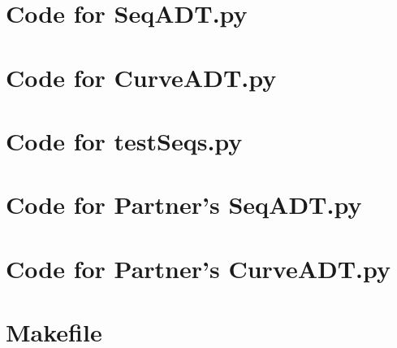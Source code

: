 \documentclass[12pt]{article}
\begin{document}
\newpage

\lstset{language=Python, basicstyle=\tiny, breaklines=true, showspaces=false,
  showstringspaces=false, breakatwhitespace=true}

\def\thesection{\Alph{section}} 

\section{Code for SeqADT.py}

\noindent 

\newpage

\section{Code for CurveADT.py}

\noindent 

\newpage

\section{Code for testSeqs.py}

\noindent 

\newpage

\section{Code for Partner's SeqADT.py}

\noindent 

\newpage

\section{Code for Partner's CurveADT.py}

\noindent 

\newpage

\section{Makefile}

\lstset{language=make}
\noindent 
\end{document}
